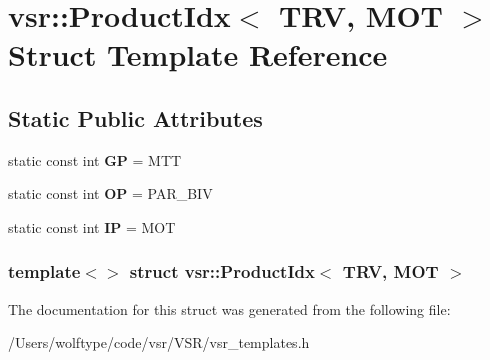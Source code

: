 \hypertarget{structvsr_1_1_product_idx_3_01_t_r_v_00_01_m_o_t_01_4}{\section{vsr\-:\-:Product\-Idx$<$ T\-R\-V, M\-O\-T $>$ Struct Template Reference}
\label{structvsr_1_1_product_idx_3_01_t_r_v_00_01_m_o_t_01_4}
}
\subsection*{Static Public Attributes}
\begin{DoxyCompactItemize}
\item 
\hypertarget{structvsr_1_1_product_idx_3_01_t_r_v_00_01_m_o_t_01_4_a36cdfebf63d20ee5a0f4679fa1c74cbb}{static const int {\bfseries G\-P} = M\-T\-T}\label{structvsr_1_1_product_idx_3_01_t_r_v_00_01_m_o_t_01_4_a36cdfebf63d20ee5a0f4679fa1c74cbb}

\item 
\hypertarget{structvsr_1_1_product_idx_3_01_t_r_v_00_01_m_o_t_01_4_a350f60ed260ae995edc150c11a1685b8}{static const int {\bfseries O\-P} = P\-A\-R\-\_\-\-B\-I\-V}\label{structvsr_1_1_product_idx_3_01_t_r_v_00_01_m_o_t_01_4_a350f60ed260ae995edc150c11a1685b8}

\item 
\hypertarget{structvsr_1_1_product_idx_3_01_t_r_v_00_01_m_o_t_01_4_ab210d78c7c6e041e82e9f8a5feb5c4e8}{static const int {\bfseries I\-P} = M\-O\-T}\label{structvsr_1_1_product_idx_3_01_t_r_v_00_01_m_o_t_01_4_ab210d78c7c6e041e82e9f8a5feb5c4e8}

\end{DoxyCompactItemize}
\subsubsection*{template$<$$>$ struct vsr\-::\-Product\-Idx$<$ T\-R\-V, M\-O\-T $>$}



The documentation for this struct was generated from the following file\-:\begin{DoxyCompactItemize}
\item 
/\-Users/wolftype/code/vsr/\-V\-S\-R/vsr\-\_\-templates.\-h\end{DoxyCompactItemize}
